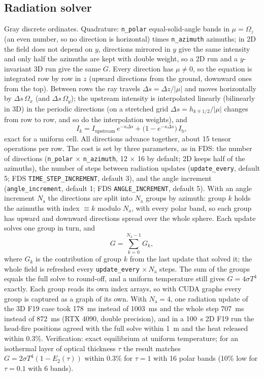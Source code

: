 \documentclass[11pt,a4paper]{article}
\newcommand{\code}[1]{\texttt{#1}}
\begin{document}
\subsection{Radiation solver}
Gray discrete ordinates. Quadrature: \code{n\_polar} equal-solid-angle bands in
$\mu=\Omega_z$ (an even number, so no direction is horizontal) times \code{n\_azimuth} azimuths; in
2D the field does not depend on $y$, directions mirrored in $y$ give the same intensity and only
half the azimuths are kept with double weight, so a 2D run and a $y$-invariant 3D run give the same
$G$. Every direction has $\mu\ne0$, so the equation is integrated row by row in $z$ (upward
directions from the ground, downward ones from the top). Between rows the ray travels
$\Delta s=\Delta z/|\mu|$ and moves horizontally by $\Delta s\,\Omega_x$ (and $\Delta s\,\Omega_y$); the
upstream intensity is interpolated linearly (bilinearly in 3D) in the periodic directions (on a stretched
grid $\Delta s=h_{k\mp1/2}/|\mu|$ changes from row to row, and so do the interpolation weights), and
\begin{equation}
  I_k = I_{\text{upstream}}\,e^{-\kappa\Delta s} + \big(1-e^{-\kappa\Delta s}\big)\,I_\text{b},
\end{equation}
exact for a uniform cell. All directions advance together, about 15 tensor operations per row.
The cost is set by three parameters, as in FDS: the number of directions (\code{n\_polar} $\times$
\code{n\_azimuth}, 12 $\times$ 16 by default; 2D keeps half of the azimuths), the number of steps between
radiation updates (\code{update\_every}, default 5; FDS \code{TIME\_STEP\_INCREMENT}, default 3), and the
angle increment (\code{angle\_increment}, default 1; FDS \code{ANGLE\_INCREMENT}, default 5). With an
angle increment $N_\text{a}$ the directions are split into $N_\text{a}$ groups by azimuth: group $k$ holds the
azimuths with index $\equiv k$ modulo $N_\text{a}$, with every polar band, so each group has upward and
downward directions spread over the whole sphere. Each update solves one group in turn, and
\begin{equation}
  G=\sum_{k=0}^{N_\text{a}-1}G_k,
\end{equation}
where $G_k$ is the contribution of group $k$ from the last update that solved it; the whole field is
refreshed every \code{update\_every} $\times\,N_\text{a}$ steps. The sum of the groups equals the full solve
to round-off, and a uniform temperature still gives $G=4\sigma T^4$ exactly. Each group reads its own
index arrays, so with CUDA graphs every group is captured as a graph of its own. With $N_\text{a}=4$, one
radiation update of the 3D F19 case took 178~ms instead of 1003~ms and the whole step 707~ms instead of
872~ms (RTX 4090, double precision), and in a 100~s 2D F19 run the head-fire positions agreed with the full
solve within 1~m and the heat released within 0.3\%.
Verification: exact equilibrium at uniform temperature; for an isothermal layer of optical
thickness $\tau$ the result matches $G=2\sigma T^4(1-E_2(\tau))$ within 0.3\% for $\tau=1$ with 16
polar bands (10\% low for $\tau=0.1$ with 6 bands).
\end{document}
